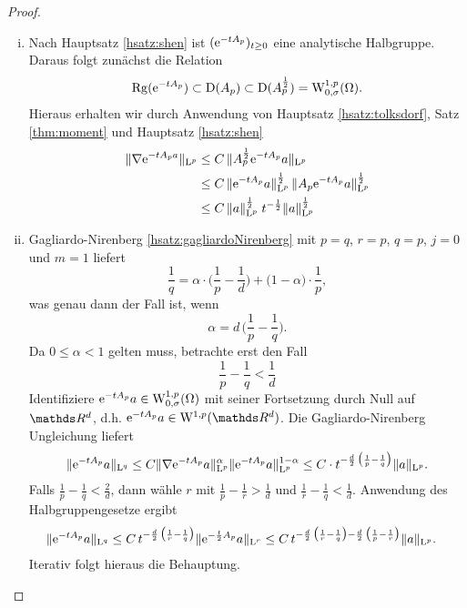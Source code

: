 \begin{proof}
  \begin{enumerate}[i)]
    \item Nach Hauptsatz \ref{hsatz:shen} ist $(\mathrm{e}^{-tA_p})_{t \geq 0}$ eine analytische Halbgruppe.
      Daraus folgt zunächst die Relation
      $$
      \operatorname{Rg}(\mathrm{e}^{-tA_p}) \subset \mathrm{D}(A_p) \subset \mathrm{D}(A_p^{\frac{1}{2}}) = \mathrm{W}_{0,\sigma}^{1,p}(\Omega).
      $$
      Hieraus erhalten wir durch Anwendung von Hauptsatz \ref{hsatz:tolksdorf}, Satz \ref{thm:moment} und Hauptsatz \ref{hsatz:shen}
      \begin{align*}
        \|\nabla \mathrm{e}^{-t A_p a}\|_{\mathrm{L}^p}
        &\leq C \, \|A_p^{\frac{1}{2}} \mathrm{e}^{-t A_p} a\|_{\mathrm{L}^p} \\
        &\leq C\, \|\mathrm{e}^{-tA_p} a \|_{\mathrm{L}^p}^{\frac{1}{2}} \, \|A_p \mathrm{e}^{-t A_p} a\|_{\mathrm{L}^p}^{\frac{1}{2}} \\
        &\leq C\, \|a\|_{\mathrm{L}^p}^{\frac{1}{2}} \; t^{-\frac{1}{2}} \|a\|_{\mathrm{L}^p}^{\frac{1}{2}} 
      \end{align*}

    \item Gagliardo-Nirenberg \ref{hsatz:gagliardoNirenberg} mit $p = q$, $r = p$, $q = p$, $j = 0$ und $m = 1$ liefert
      $$
      \frac{1}{q} = \alpha\cdot \big(\frac{1}{p} - \frac{1}{d}\big) + \big(1 - \alpha \big) \cdot \frac{1}{p},
      $$
      was genau dann der Fall ist, wenn
      $$
      \alpha = d \, \big( \frac{1}{p} - \frac{1}{q} \big).
      $$
      Da $0 \leq \alpha < 1$ gelten muss, betrachte erst den Fall
      $$
      \frac{1}{p} - \frac{1}{q} < \frac{1}{d}
      $$
      Identifiziere $\mathrm{e}^{-tA_p} a \in \mathrm{W}_{0,\sigma}^{1,p}(\Omega)$ mit seiner Fortsetzung durch Null auf $\R^d$, d.h. $\e^{-t A_p} a \in \WW^{1,p}(\R^d)$.
      Die Gagliardo-Nirenberg Ungleichung liefert
      $$
      \|\mathrm{e}^{-t A_p} a \|_{\mathrm{L}^q} \leq C \| \nabla \mathrm{e}^{-t A_p} a \|_{\mathrm{L}^p}^\alpha \|\mathrm{e}^{-t A_p} a \|_{\mathrm{L}^p}^{1 - \alpha}
      \leq C \cdot t^{-\frac{d}{2} \, \big( \frac{1}{p} - \frac{1}{q} \big)} \|a\|_{\mathrm{L}^p}.
      $$
      Falls $\frac{1}{p} - \frac{1}{q} < \frac{2}{d}$, dann wähle $r$ mit $\frac{1}{p} - \frac{1}{r} > \frac{1}{d}$ und $\frac{1}{r} - \frac{1}{q} < \frac{1}{d}$.
      Anwendung des Halbgruppengesetze ergibt
      \begin{align*}
        \|\mathrm{e}^{-tA_p} a\|_{\mathrm{L}^q} 
        &\leq C \, t^{-\frac{d}{2} \, \big( \frac{1}{r} - \frac{1}{q} \big)} \|\mathrm{e}^{-\frac{t}{2} A_p} a \|_{\mathrm{L}^r}  
        \leq C\, t^{-\frac{d}{2} \, \big( \frac{1}{r} - \frac{1}{q} \big) - \frac{d}{2} \, \big( \frac{1}{p} - \frac{1}{r} \big)} \|a\|_{\mathrm{L}^p}.
      \end{align*}
      Iterativ folgt hieraus die Behauptung. \qedhere
  \end{enumerate}
\end{proof}
